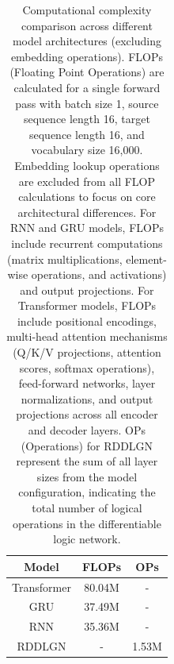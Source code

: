 \begin{table}[!htb]
\centering
\setlength{\tabcolsep}{3mm}
\begin{sc}
\begin{tabular}{c|cc}
\toprule
Model & FLOPs & OPs \\
\midrule
Transformer & 80.04M & - \\
GRU & 37.49M & - \\
RNN & 35.36M & - \\
RDDLGN & - & 1.53M \\
\bottomrule
\end{tabular}
\end{sc}
\caption{Computational complexity comparison across different model architectures (excluding embedding operations). 
FLOPs (Floating Point Operations) are calculated for a single forward pass with batch size 1, 
source sequence length 16, target sequence length 16, and vocabulary size 16,000. 
Embedding lookup operations are excluded from all FLOP calculations to focus on core architectural differences. 
For RNN and GRU models, FLOPs include recurrent computations (matrix multiplications, element-wise operations, 
and activations) and output projections. For Transformer models, FLOPs include positional encodings, 
multi-head attention mechanisms (Q/K/V projections, attention scores, softmax operations), feed-forward networks, 
layer normalizations, and output projections across all encoder and decoder layers. OPs (Operations) for RDDLGN 
represent the sum of all layer sizes from the model configuration, indicating the total number of logical 
operations in the differentiable logic network.}
\label{tab:computational_complexity}
\end{table}